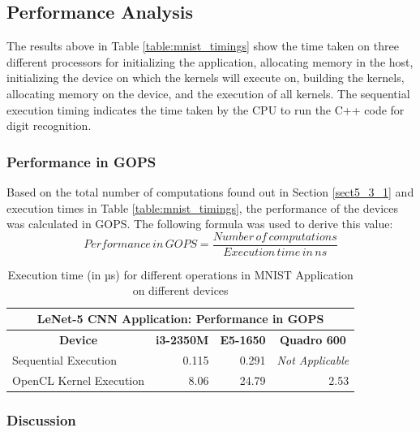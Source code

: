 \subsection{Performance Analysis}
\label{sect5_3_3}
The results above in Table \ref{table:mnist_timings} show the time taken on three different processors for initializing the application, allocating memory in the host, initializing the device on which the kernels will execute on, building the kernels, allocating memory on the device, and the execution of all kernels. The sequential execution timing indicates the time taken by the CPU to run the C++ code for digit recognition.

\subsubsection*{Performance in GOPS}
\label{sect5_3_3_a}
Based on the total number of computations found out in Section \ref{sect5_3_1} and execution times in Table \ref{table:mnist_timings}, the performance of the devices was calculated in \ac{GOPS}. The following formula was used to derive this value:
\[Performance \, in \, GOPS=\frac{Number \, of \, computations}{Execution \, time \, in \, ns}\]

\begin{table}[h!]
\centering
 \caption{Execution time (in µs) for different operations in MNIST Application on different devices}
 \vspace{3mm}
 \renewcommand\arraystretch{1.6}
 \begin{tabular}{ | m{12em} | r | r | r |  }
 \hline
 \multicolumn{4}{|c|}{LeNet-5 CNN Application: Performance in GOPS} \\
 \hline
 \multicolumn{1}{|c|}{\bfseries Device} & \multicolumn{1}{c|}{\bfseries i3-2350M} & \multicolumn{1}{c|}{\bfseries E5-1650} & \multicolumn{1}{c|}{\bfseries Quadro 600} \\
 \hline
 Sequential Execution & 0.115 &  0.291 & \textit{Not Applicable} \\\hline
 OpenCL Kernel Execution & 8.06 &  24.79 & 2.53 \\
 
 \hline
 \end{tabular}
 \label{table:mnist_gops}
\end{table}

\subsubsection*{Discussion}
\label{sect5_3_3_b}

